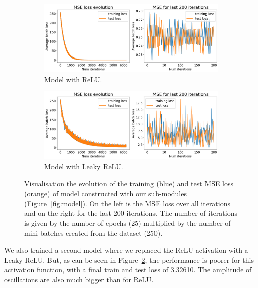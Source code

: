 \documentclass[10pt,conference,compsocconf]{IEEEtran}
\begin{document}
\begin{figure}[t]
        \centering
        \begin{subfigure}[b]{\columnwidth}
            \centering \includegraphics[width=\columnwidth]{doc/project2-report/Loss_project_2.png}
            \caption[]%
            {\small Model with ReLU.}   
     \label{fig:relu}
        \end{subfigure}
                \hfill 
        \begin{subfigure}[b]{\columnwidth}
            \centering \includegraphics[width=\columnwidth]{doc/project2-report/Loss_project_2_leaky.png}
            \caption[]%
            {\small Model with Leaky ReLU.}     \label{fig:leaky-relu}
        \end{subfigure}
        \caption[]
        {Visualisation the evolution of the training (blue) and test MSE loss (orange) of model constructed with our sub-modules (Figure~\ref{fig:model}). On the left is the MSE loss over all iterations and on the right for the last 200 iterations. The number of iterations is given by the number of epochs (25) multiplied by the number of mini-batches created from the dataset (250).}
        \label{fig:loss-our-model}
    \end{figure}


We also trained a second model where we replaced the ReLU activation with a Leaky ReLU. But, as can be seen in Figure~\ref{fig:leaky-relu}, the performance is poorer for this activation function, with a final train and test loss of 3.32610. The amplitude of oscillations are also much bigger than for ReLU.  
\end{document}
